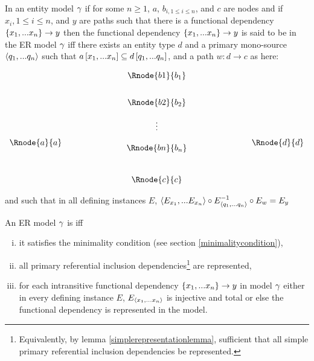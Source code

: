 \begin{definition}
\noindent In an entity model $\gamma$  
if for some $n \geq 1$, $a$, $b_{i, 1 \leq i \leq n}$,  and $c$ are nodes and 
if  $x_{i}, 1 \leq i \leq n$, and $y$ are paths such
that there is a functional dependency $\{x_1,...x_n\} \rightarrow y$
 then the functional dependency $\{x_1,...x_n\} \rightarrow y$ is said to be  in the ER model $\gamma$ iff  there exists an entity type $d$ and a primary mono-source
$\langle q_1,...q_n\rangle$  such that $a\left[x_1,...x_n\right]\subseteq d\left[q_1,...q_n\right]$, and a 
path $w:d\rightarrow c$ as here:

\setlength{\arraycolsep}{.2cm}
\begin{center}
$
\begin{array}{cp{2cm}c p{2cm} c}
             &  & \Rnode{b1}{b_1} & &               \\ [0.7cm]
						 &  & \Rnode{b2}{b_2} & &               \\ [0.4cm]
						 &  &     \vdots      & &               \\ [0.2cm]
\Rnode{a}{a} &  &                 & & \Rnode{d}{d}  \\ [-0.2cm]
             &  & \Rnode{bn}{b_n} & &               \\ [0.9cm]
             &  & \Rnode{c}{c}    & &               \\
\end{array}
$
\end{center}

and such that in all defining instances $E$, 
$\langle E_{x_1},...E_{x_n}\rangle \circ E^{-1}_{\langle q_1,...q_n\rangle}\circ E_w = E_y$
\end{definition}
 
\begin{definition}
\noindent An ER model $\gamma$ is  
 iff 
\begin{enumerate} [(i)]
\item{
it satisfies the minimality condition (see section \ref{minimalitycondition}),
}
\item{ 
all primary referential inclusion dependencies\footnote{Equivalently, by lemma
\ref{simplerepresentationlemma}, sufficient that all simple primary referential inclusion dependencies be represented.} are  represented,
}
\item{
for each intransitive functional dependency $\left\{x_1,...x_n\right\} \rightarrow y$ in model $\gamma$
either in every defining instance $E$, $E_{\langle x_1,...x_n\rangle}$ is injective and total
or else the functional dependency is represented in the model.
}
\end{enumerate}
\end{definition}

